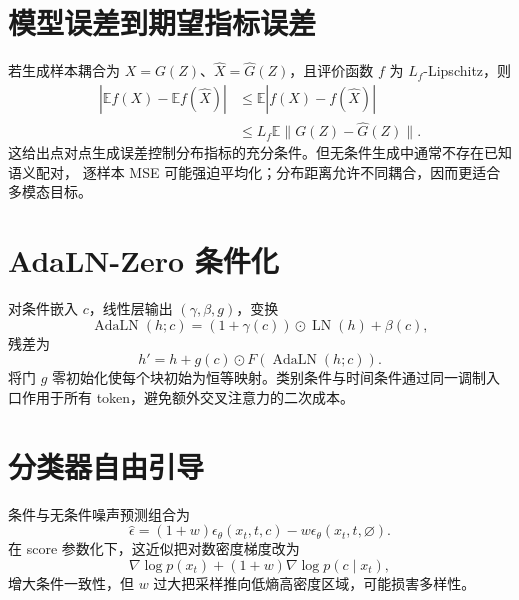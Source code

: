\documentclass[11pt]{article}
\numberwithin{equation}{section}
\newcommand{\E}{\mathbb{E}}
\newcommand{\1}{\mathbf{1}}
\begin{document}
\section{模型误差到期望指标误差}

若生成样本耦合为 $X=G(Z)$、$\widehat X=\widehat G(Z)$，且评价函数
$f$ 为 $L_f$-Lipschitz，则
\begin{align}
 |\E f(X)-\E f(\widehat X)|
 &\le\E|f(X)-f(\widehat X)|\\
 &\le L_f\E\|G(Z)-\widehat G(Z)\|.
\end{align}
这给出点对点生成误差控制分布指标的充分条件。但无条件生成中通常不存在已知语义配对，
逐样本 MSE 可能强迫平均化；分布距离允许不同耦合，因而更适合多模态目标。

\section{AdaLN-Zero 条件化}
对条件嵌入 $c$，线性层输出 $(\gamma,\beta,g)$，变换
\begin{equation}
  \operatorname{AdaLN}(h;c)=(1+\gamma(c))\odot\operatorname{LN}(h)+\beta(c),
\end{equation}
残差为
\begin{equation}
  h'=h+g(c)\odot F(\operatorname{AdaLN}(h;c)).
\end{equation}
将门 $g$ 零初始化使每个块初始为恒等映射。类别条件与时间条件通过同一调制入口作用于所有 token，避免额外交叉注意力的二次成本。

\section{分类器自由引导}
条件与无条件噪声预测组合为
\begin{equation}
  \hat\epsilon=(1+w)\epsilon_\theta(x_t,t,c)-w\epsilon_\theta(x_t,t,\varnothing).
\end{equation}
在 score 参数化下，这近似把对数密度梯度改为
\begin{equation}
  \nabla\log p(x_t)+ (1+w)\nabla\log p(c\mid x_t),
\end{equation}
增大条件一致性，但 $w$ 过大把采样推向低熵高密度区域，可能损害多样性。
\end{document}
